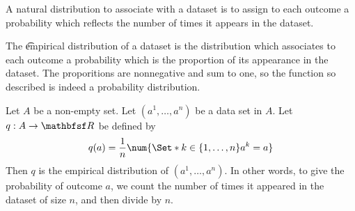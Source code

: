 

A natural distribution to associate with a dataset is to assign to each outcome a probability which reflects the number of times it appears in the dataset.


The \t{empirical distribution} of a dataset is the distribution which associates to each outcome a probability which is the proportion of its appearance in the dataset.
The proporitions are nonnegative and sum to one, so the function so described is indeed a probability distribution.


Let $A$ be a non-empty set.
Let $(a^1, \dots, a^n)$ be a data set in $A$.
Let $q: A \to \R$ be defined by
$$
  q(a) = \frac{1}{n} \num{\Set*{k \in \set{1, \dots, n}}{a^k = a}}
$$
Then $q$ is the empirical distribution of $(a^1, \dots, a^n)$.
In other words, to give the probability of outcome $a$, we count the number of times it appeared in the dataset of size $n$, and then divide by $n$.

\blankpage
